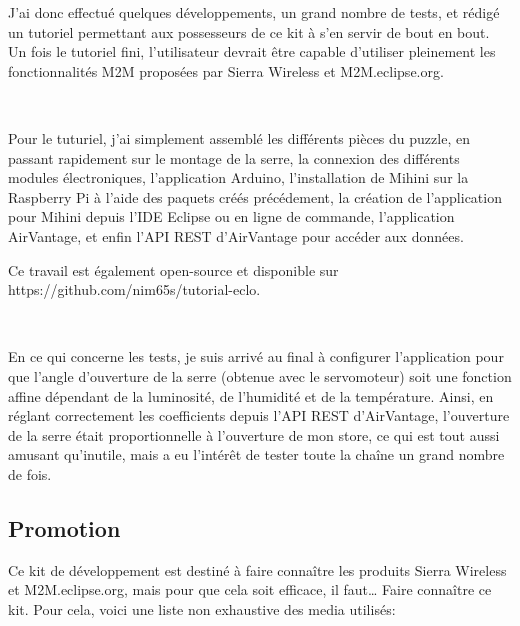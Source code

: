 \documentclass{article}
\begin{document}
J’ai donc effectué quelques développements, un grand nombre de tests, et rédigé un tutoriel permettant aux possesseurs de ce kit à s’en servir de bout en bout. Un fois le tutoriel fini, l’utilisateur devrait être capable d’utiliser pleinement les fonctionnalités M2M proposées par Sierra Wireless et M2M.eclipse.org.

~

Pour le tuturiel, j’ai simplement assemblé les différents pièces du puzzle, en passant rapidement sur le montage de la serre, la connexion des différents modules électroniques, l’application Arduino, l’installation de Mihini sur la Raspberry Pi à l’aide des paquets créés précédement, la création de l’application pour Mihini depuis l’IDE Eclipse ou en ligne de commande, l’application AirVantage, et enfin l’API REST d’AirVantage pour accéder aux données.

Ce travail est également open-source et disponible sur https://github.com/nim65s/tutorial-eclo.

~

En ce qui concerne les tests, je suis arrivé au final à configurer l’application pour que l’angle d’ouverture de la serre (obtenue avec le servomoteur) soit une fonction affine dépendant de la luminosité, de l’humidité et de la température. 
Ainsi, en réglant correctement les coefficients depuis l’API REST d’AirVantage, l’ouverture de la serre était proportionnelle à l’ouverture de mon store, ce qui est tout aussi amusant qu’inutile, mais a eu l’intérêt de tester toute la chaîne un grand nombre de fois.

\subsection{Promotion}

Ce kit de développement est destiné à faire connaître les produits Sierra Wireless et M2M.eclipse.org, mais pour que cela soit efficace, il faut… Faire connaître ce kit. Pour cela, voici une liste non exhaustive des media utilisés:
\end{document}
